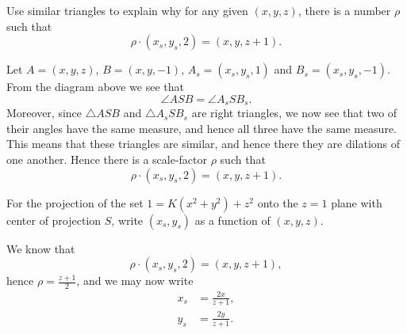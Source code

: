 \documentclass{ximera}
\begin{document}
\begin{problem}
  Use similar triangles to explain why for any given $(x,y,z)$, there
  is a number $\rho$ such that
  \[
  \rho\cdot(x_s,y_s,2) = (x,y,z+1).
  \]
  \begin{freeResponse}
    Let $A = (x,y,z)$, $B= (x,y,-1)$, $A_s = (x_s,y_s,1)$ and
    $B_s=(x_s,y_s,-1)$. From the diagram above we see that
    \[
    \angle ASB = \angle A_s S B_s.
    \]
    Moreover, since $\triangle ASB$ and $\triangle A_s S B_s$ are
    right triangles, we now see that two of their angles have the same
    measure, and hence all three have the same measure. This means
    that these triangles are similar, and hence there they are
    dilations of one another. Hence there is a scale-factor $\rho$
    such that
    \[
    \rho\cdot(x_s,y_s,2) = (x,y,z+1).
    \]
  \end{freeResponse}
\end{problem}

\begin{problem}
  For the projection of the set $1=K\left(x^{2}+y^{2}\right)+z^{2}$
  onto the $z=1$ plane with center of projection $S$, write
  $(x_{s},y_{s})$ as a function of $(x,y,z)$.
  \begin{freeResponse}
    We know that
    \[
    \rho\cdot(x_{s},y_{s},2)=(x,y,z+1),
    \]
    hence $\rho=\frac{z+1}{2}$, and we may now write
    \begin{align*}
      x_{s} &=\frac{2x}{z+1},\\
      y_{s} &=\frac{2y}{z+1}.
    \end{align*}
  \end{freeResponse}
\end{problem}
\end{document}
